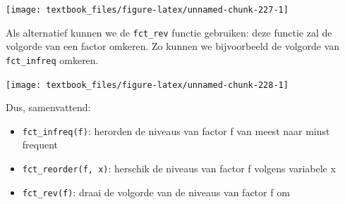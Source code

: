 \documentclass[]{tufte-book}
\newenvironment{Shaded}{}{}
\newcommand{\DataTypeTok}[1]{\textcolor[rgb]{0.56,0.13,0.00}{#1}}
\newcommand{\KeywordTok}[1]{\textcolor[rgb]{0.00,0.44,0.13}{\textbf{#1}}}
\newcommand{\NormalTok}[1]{#1}
\newcommand{\OperatorTok}[1]{\textcolor[rgb]{0.40,0.40,0.40}{#1}}
\newcommand{\StringTok}[1]{\textcolor[rgb]{0.25,0.44,0.63}{#1}}
\providecommand{\tightlist}{%
  \setlength{\itemsep}{0pt}\setlength{\parskip}{0pt}}
\begin{document}
\begin{Shaded}
\end{Shaded}

\texttt{[image: textbook\_files/figure-latex/unnamed-chunk-227-1]}

Als alternatief kunnen we de \texttt{fct\_rev} functie gebruiken: deze functie zal de volgorde van een factor omkeren. Zo kunnen we bijvoorbeeld de volgorde van \texttt{fct\_infreq} omkeren.

\begin{Shaded}
\end{Shaded}

\texttt{[image: textbook\_files/figure-latex/unnamed-chunk-228-1]}

Dus, samenvattend:

\begin{itemize}
\tightlist
\item
  \texttt{fct\_infreq(f)}: herorden de niveaus van factor f van meest naar minst frequent
\item
  \texttt{fct\_reorder(f,\ x)}: herschik de niveaus van factor f volgens variabele x
\item
  \texttt{fct\_rev(f)}: draai de volgorde van de niveaus van factor f om
\end{itemize}
\end{document}
